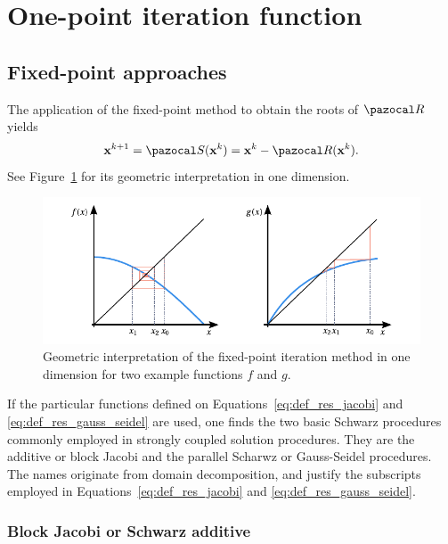 \section{One-point iteration function}

\subsection{Fixed-point approaches} \label{sec:fixed_point_approach}

The application of the fixed-point method to obtain the roots of \(\pazocal R\) yields
\begin{equation}
  \mathbf x^{k+1} = \pazocal S(\mathbf x^k) = \mathbf x^k - \pazocal R(\mathbf x^k).
\end{equation}
See Figure~\ref{fig:fixed_point_iteration} for its geometric interpretation in one dimension.

\begin{figure}
  \includegraphics{figures/fixed_point_iteration}
  \caption{Geometric interpretation of the fixed-point iteration method in one dimension for two example functions \(f\) and \(g\).}
  \label{fig:fixed_point_iteration}
\end{figure}

If the particular functions defined on Equations~\eqref{eq:def_res_jacobi} and \eqref{eq:def_res_gauss_seidel} are used, one finds the  two basic Schwarz procedures commonly employed in strongly coupled solution procedures.
They are the additive or block Jacobi and the parallel Scharwz or Gauss-Seidel procedures.
The names originate from domain decomposition, and justify the subscripts employed in Equations~\eqref{eq:def_res_jacobi} and \eqref{eq:def_res_gauss_seidel}.

\subsubsection{Block Jacobi or Schwarz additive}

